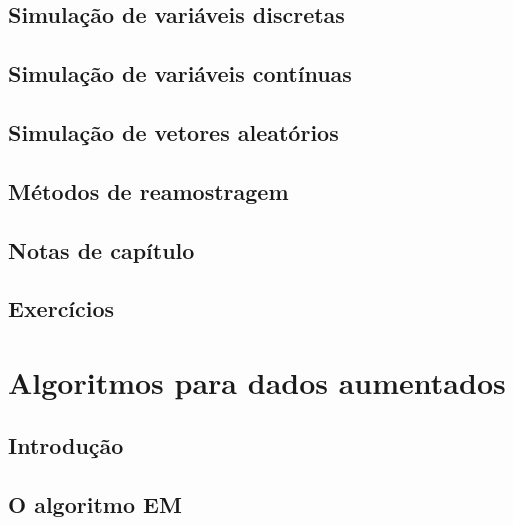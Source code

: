 \documentclass[
]{latex/krantz}
\theoremstyle{definition}
\theoremstyle{definition}
\theoremstyle{definition}
\theoremstyle{definition}
\theoremstyle{remark}
\begin{document}
\hypertarget{simulauxe7uxe3o-de-variuxe1veis-discretas}{%
\section{Simulação de variáveis discretas}\label{simulauxe7uxe3o-de-variuxe1veis-discretas}}

\hypertarget{simulauxe7uxe3o-de-variuxe1veis-contuxednuas}{%
\section{Simulação de variáveis contínuas}\label{simulauxe7uxe3o-de-variuxe1veis-contuxednuas}}

\hypertarget{simulauxe7uxe3o-de-vetores-aleatuxf3rios}{%
\section{Simulação de vetores aleatórios}\label{simulauxe7uxe3o-de-vetores-aleatuxf3rios}}

\hypertarget{muxe9todos-de-reamostragem}{%
\section{Métodos de reamostragem}\label{muxe9todos-de-reamostragem}}

\hypertarget{notas-de-capuxedtulo-14}{%
\section{Notas de capítulo}\label{notas-de-capuxedtulo-14}}

\hypertarget{exercuxedcios-14}{%
\section{Exercícios}\label{exercuxedcios-14}}

\hypertarget{algoritmos-para-dados-aumentados}{%
\chapter{Algoritmos para dados aumentados}\label{algoritmos-para-dados-aumentados}}

\hypertarget{introduuxe7uxe3o-15}{%
\section{Introdução}\label{introduuxe7uxe3o-15}}

\hypertarget{o-algoritmo-em}{%
\section{O algoritmo EM}\label{o-algoritmo-em}}
\end{document}
